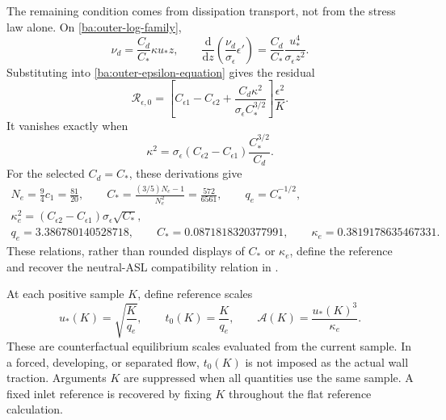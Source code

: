 \documentclass[11pt,a4paper]{article}
\numberwithin{equation}{section}
\begin{document}
The remaining condition comes from dissipation transport, not from the
stress law alone. On \eqref{ba:outer-log-family},
\begin{equation}
 \nu_d=\frac{C_d}{C_*}\kappa u_*z,\qquad
 \frac{\mathrm d}{\mathrm dz}
       \left(\frac{\nu_d}{\sigma_\epsilon}\epsilon'\right)
 =\frac{C_d}{C_*}\frac{u_*^4}{\sigma_\epsilon z^2}.
 \label{ba:outer-epsilon-diffusion}
\end{equation}
Substituting into \eqref{ba:outer-epsilon-equation} gives the residual
\begin{equation}
 \mathcal R_{\epsilon,0}
 =\left[C_{\epsilon1}-C_{\epsilon2}
       +\frac{C_d\kappa^2}{\sigma_\epsilon C_*^{3/2}}\right]
       \frac{\epsilon^2}{K}.
 \label{ba:outer-epsilon-residual}
\end{equation}
It vanishes exactly when
\begin{equation}
 \boxed{\kappa^2
 =\sigma_\epsilon(C_{\epsilon2}-C_{\epsilon1})
            \frac{C_*^{3/2}}{C_d}.}
 \label{ba:outer-kappa-condition}
\end{equation}
For the selected $C_d=C_*$, these derivations give
\begin{equation}
 \begin{gathered}
 N_e=\frac94c_1=\frac{81}{20},\qquad
 C_* =\frac{(3/5)N_e-1}{N_e^2}
      =\frac{572}{6561},\qquad q_e=C_*^{-1/2},\\
 \kappa_e^2=(C_{\epsilon2}-C_{\epsilon1})
                  \sigma_\epsilon\sqrt{C_*},\\
 q_e=3.386780140528718,\qquad
 C_*=0.0871818320377991,\qquad
 \kappa_e=0.3819178635467331.
 \end{gathered}
 \label{ba:outer-equilibrium}
\end{equation}
These relations, rather than rounded displays of $C_*$ or $\kappa_e$,
define the reference and recover the neutral-ASL compatibility relation
in \cite[Eqs.~(22)--(23)]{Baungaard2022}.

At each positive sample $K$, define reference scales
\begin{equation}
 u_*(K)=\sqrt{\frac{K}{q_e}},\qquad
 t_0(K)=\frac{K}{q_e},\qquad
 \mathcal A(K)=\frac{u_*(K)^3}{\kappa_e}.
 \label{ba:reference-scales}
\end{equation}
These are counterfactual equilibrium scales evaluated from the current
sample. In a forced, developing, or separated flow, $t_0(K)$ is not
imposed as the actual wall traction. Arguments $K$ are suppressed when
all quantities use the same sample. A fixed inlet reference is recovered
by fixing $K$ throughout the flat reference calculation.
\end{document}
